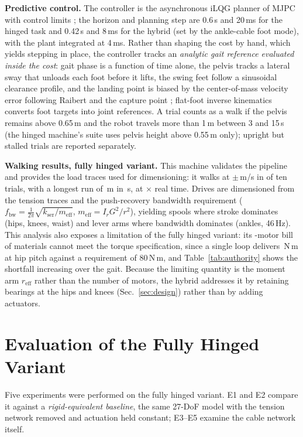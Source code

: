 \documentclass[letterpaper, 10pt, conference]{ieeeconf}
\begin{document}
\textbf{Predictive control.} The controller is the asynchronous iLQG
planner of MJPC \cite{howell2022mjpc,tassa2012synthesis} with control
limits \cite{tassa2014control}; the horizon and planning step are 0.6\,s
and 20\,ms for the hinged task and 0.42\,s and 8\,ms for the hybrid (set
by the ankle-cable foot mode), with the plant integrated at 4\,ms.
Rather than shaping the cost by hand, which yields stepping in place, the
controller tracks an \emph{analytic gait reference evaluated inside the
cost}: gait phase
is a function of time alone, the pelvis tracks a lateral sway that unloads
each foot before it lifts, the swing feet follow a sinusoidal clearance
profile, and the landing point is biased by the center-of-mass velocity
error following Raibert \cite{raibert1986legged} and the capture point
\cite{pratt2006capture}; flat-foot inverse kinematics converts foot
targets into joint references. A trial counts as a walk if the pelvis remains above 0.65\,m and the
robot travels more than 1\,m between 3 and 15\,s (the hinged machine's
suite uses pelvis height above 0.55\,m only); upright but stalled trials
are reported separately.

\textbf{Walking results, fully hinged variant.} This machine validates the
pipeline and provides the load traces used for dimensioning: it walks at
\walkSpeed$\pm$\walkSpeedSd\,m/s in \walkRate{} of ten trials, with a longest run of \longRunM\,m in \longRunS\,s, at
\realtimeFactor$\times$ real time. Drives are dimensioned from the tension traces and
the push-recovery bandwidth requirement
($f_{\mathrm{bw}}=\frac{1}{2\pi}\sqrt{k_{\mathrm{ser}}/m_{\mathrm{eff}}}$,
$m_{\mathrm{eff}}=I_rG^2/r^2$), yielding spools where stroke dominates
(hips, knees, waist) and lever arms where bandwidth dominates (ankles,
46\,Hz). This analysis also exposes a limitation of the fully hinged variant: its
\numMotors-motor bill of materials cannot meet the torque specification,
since a single loop delivers \singleLoopHip\,N\,m at hip pitch against a
requirement of 80\,N\,m, and Table~\ref{tab:authority} shows the shortfall
increasing over the gait. Because the limiting quantity is the moment arm
$r_{\mathrm{eff}}$ rather than the number of motors, the hybrid addresses
it by retaining bearings at the hips and knees (Sec.~\ref{sec:design})
rather than by adding actuators.

\section{Evaluation of the Fully Hinged Variant}
\label{sec:evidence}
Five experiments were performed on the fully hinged variant. E1 and E2
compare it against a \emph{rigid-equivalent baseline}, the same 27-DoF
model with the tension network removed and actuation held constant; E3--E5
examine the cable network itself.
\end{document}
